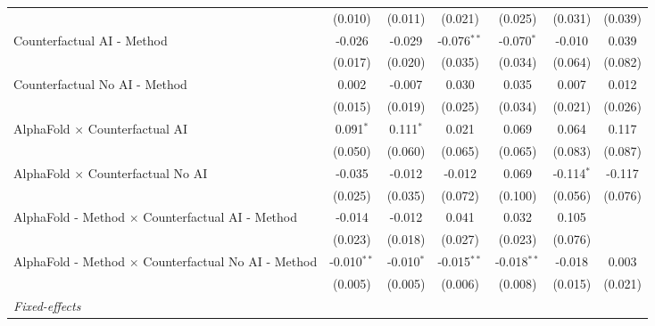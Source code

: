 \begin{tabular}{lcccccc}
                                                              & (0.010)       & (0.011)        & (0.021)       & (0.025)        & (0.031)      & (0.039)\\   
   Counterfactual AI - Method                                 & -0.026        & -0.029         & -0.076$^{**}$ & -0.070$^{*}$   & -0.010       & 0.039\\   
                                                              & (0.017)       & (0.020)        & (0.035)       & (0.034)        & (0.064)      & (0.082)\\   
   Counterfactual No AI - Method                              & 0.002         & -0.007         & 0.030         & 0.035          & 0.007        & 0.012\\   
                                                              & (0.015)       & (0.019)        & (0.025)       & (0.034)        & (0.021)      & (0.026)\\   
   AlphaFold $\times$ Counterfactual AI                       & 0.091$^{*}$   & 0.111$^{*}$    & 0.021         & 0.069          & 0.064        & 0.117\\   
                                                              & (0.050)       & (0.060)        & (0.065)       & (0.065)        & (0.083)      & (0.087)\\   
   AlphaFold $\times$ Counterfactual No AI                    & -0.035        & -0.012         & -0.012        & 0.069          & -0.114$^{*}$ & -0.117\\   
                                                              & (0.025)       & (0.035)        & (0.072)       & (0.100)        & (0.056)      & (0.076)\\   
   AlphaFold - Method $\times$ Counterfactual AI - Method     & -0.014        & -0.012         & 0.041         & 0.032          & 0.105        &   \\   
                                                              & (0.023)       & (0.018)        & (0.027)       & (0.023)        & (0.076)      &   \\   
   AlphaFold - Method $\times$ Counterfactual No AI - Method  & -0.010$^{**}$ & -0.010$^{*}$   & -0.015$^{**}$ & -0.018$^{**}$  & -0.018       & 0.003\\   
                                                              & (0.005)       & (0.005)        & (0.006)       & (0.008)        & (0.015)      & (0.021)\\   
   \midrule
   \emph{Fixed-effects}\\

\end{tabular}
